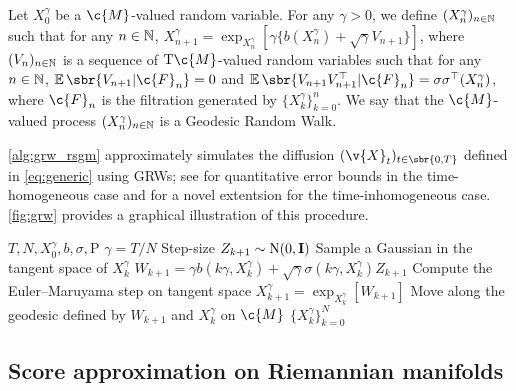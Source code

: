 \begin{definition}
	Let $X^\gamma_0$ be a $\c{M}$-valued random variable.
	For any $\gamma > 0$, we define $(X_n^\gamma)_{n \in \mathbb{N}}$ such that for any $n \in \mathbb{N}$, $X_{n+1}^\gamma = \exp_{X_{n}^\gamma}[\gamma \{ b(X_{n}^\gamma) + \sqrt{\gamma} V_{n+1} \}]$, where $(V_n)_{n \in \mathbb{N}}$ is a sequence of $\mathrm{T}\c{M}$-valued random variables such that for any $n \in \mathbb{N}$, $\E\sbr{V_{n+1}|\c{F}_n} = 0$ and $\E\sbr{V_{n+1} V_{n+1}^\top | \c{F}_n} = \sigma \sigma^\top(X_n^\gamma)$, where $\c{F}_n$ is the filtration generated by $\{X_k^\gamma\}_{k=0}^n$.
	We say that the $\c{M}$-valued process $(X_n^\gamma)_{n \in \mathbb{N}}$ is a Geodesic Random Walk.
\end{definition}

\cref{alg:grw_rsgm} approximately simulates the diffusion
$(\v{X}_t)_{t \in \sbr{0,T}}$ defined in \cref{eq:generic} using GRWs; see \textcite{kuwada2012convergence,cheng2022theorymanifold} for quantitative error bounds in the time-homogeneous
case and  for a novel extentsion for the time-inhomogeneous case. \cref{fig:grw} provides a graphical illustration of this procedure.

\begin{algorithm}[!t]
	\caption{\small GRW (Geodesic Random Walk)}
	\label{alg:grw_rsgm}
	\begin{algorithmic}[1]
		\small
		\Require $T, N, X_0^\gamma, b, \sigma, \mathrm{P}$
		\State $\gamma = T / N$ \Comment Step-size
		\State $Z_{k+1} \sim \mathrm{N}(0, \m{I})$ \Comment Sample a Gaussian in the tangent space of $X_{k}^\gamma$
		\State $W_{k+1} = \gamma b(k \gamma, X_k^\gamma) + \sqrt{\gamma} \sigma(k \gamma, X_k^\gamma) Z_{k+1}$ \Comment Compute the Euler--Maruyama step on tangent space
		\State $X_{k+1}^\gamma = \exp_{X_k^\gamma}[W_{k+1}]$ \Comment Move along the geodesic defined by $W_{k+1}$ and $X_{k}^\gamma$ on $\c{M}$
		\EndFor
		 $\{ X_k^\gamma\}_{k=0}^{N}$
	\end{algorithmic}
\end{algorithm}

\subsection{Score approximation on Riemannian manifolds}
\label{sec:riem-score-appr}
